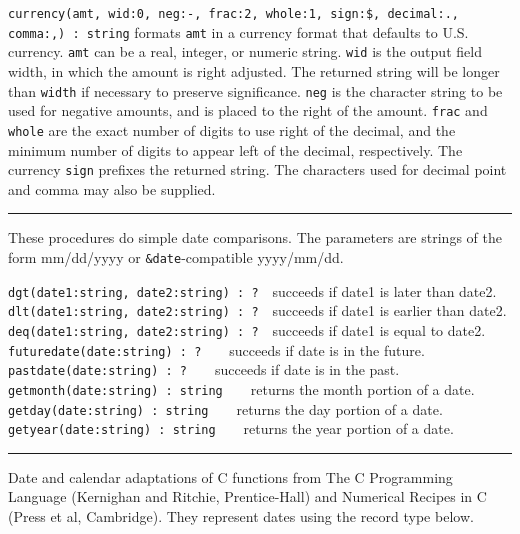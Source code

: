 \texttt{currency(amt, wid:0, neg:{\textquotedbl}-{\textquotedbl},
frac:2, whole:1, sign:{\textquotedbl}\${\textquotedbl},
decimal:{\textquotedbl}.{\textquotedbl},
comma:{\textquotedbl},{\textquotedbl}) : string} formats \texttt{amt}
in a currency format that defaults to U.S. currency. \texttt{amt} can
be a real, integer, or numeric string. \texttt{wid} is the output field
width, in which the amount is right adjusted. The returned string will
be longer than \texttt{width} if necessary to preserve significance.
\texttt{neg} is the character string to be used for negative amounts,
and is placed to the right of the amount. \texttt{frac} and
\texttt{whole} are the exact number of digits to use right of the
decimal, and the minimum number of digits to appear left of the
decimal, respectively. The currency \texttt{sign} prefixes the returned
string. The characters used for decimal point and comma may also be
supplied.

\vspace{0.25cm}\hrule{}

These procedures do simple date comparisons. The
parameters are strings of the form mm/dd/yyyy or
\texttt{\&date}{}-compatible yyyy/mm/dd.

\texttt{dgt(date1:string, date2:string) : ?}\ \ succeeds if date1 is later than
date2.\\
\texttt{dlt(date1:string, date2:string) : ?}\ \ succeeds if date1 is earlier than
date2.\\
\texttt{deq(date1:string, date2:string) : ?}\ \ succeeds if date1 is equal to
date2.\\
\texttt{futuredate(date:string) : ?}\ \ \ \ succeeds if date is in the
future.\\
\texttt{pastdate(date:string) : ?}\ \ \ \ succeeds if date is in the
past.\\
\texttt{getmonth(date:string) : string}\ \ \ \ returns the month portion of a
date.\\
\texttt{getday(date:string) : string}\ \ \ \ returns the day portion of a
date.\\
\texttt{getyear(date:string) : string}\ \ \ \ returns the year portion of a date.

\vspace{0.25cm}\hrule{}

Date and calendar adaptations of C functions from
{\textquotedbl}The C Programming Language{\textquotedbl} (Kernighan and
Ritchie, Prentice-Hall) and {\textquotedbl}Numerical Recipes in
C{\textquotedbl} (Press et al, Cambridge). They represent dates using
the record type below.

